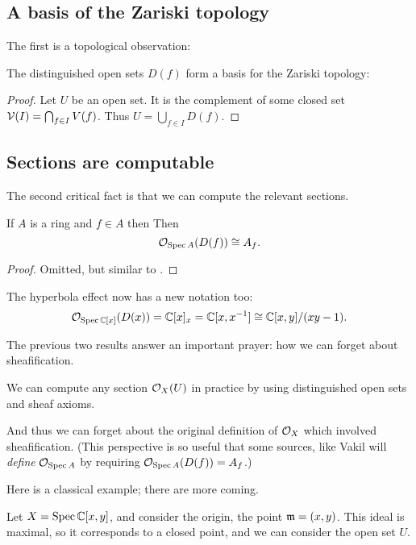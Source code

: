 \subsection{A basis of the Zariski topology}
The first is a topological observation:
\begin{theorem}
	The distinguished open sets $D(f)$
	form a basis for the Zariski topology:
\end{theorem}
\begin{proof}
	Let $U$ be an open set.
	It is the complement of some closed set
	$\mathcal V(I) = \bigcap_{f \in I} V(f)$.
	Thus $U = \bigcup_{f \in I} D(f)$.
\end{proof}

\subsection{Sections are computable}
The second critical fact is that we can compute the relevant sections.
\begin{theorem}
	If $A$ is a ring and $f \in A$ then
	Then \[ \mathcal O_{\operatorname{Spec} A}(D(f)) \cong A_f. \]
\end{theorem}
\begin{proof}
	Omitted, but similar to
	.
\end{proof}

\begin{example}
	The hyperbola effect now has a new notation too:
	\[ \mathcal O_{\operatorname{Spec} \mathbb C[x]} (D(x))
		= \mathbb C[x]_{x} = \mathbb C[x, x^{-1}]
		\cong \mathbb C[x,y] / (xy-1). \]
\end{example}

The previous two results answer an important prayer:
how we can forget about sheafification.
\begin{moral}
	We can compute any section $\mathcal O_X(U)$ in practice
	by using distinguished open sets and sheaf axioms.
\end{moral}
And thus we can forget about the original definition of $\mathcal O_X$
which involved sheafification.
(This perspective is so useful that some sources,
like Vakil \cite[\S4.1]{ref:vakil}
will \emph{define} $\mathcal O_{\operatorname{Spec} A}$
by requiring $\mathcal O_{\operatorname{Spec} A}(D(f)) = A_f$.)

Here is a classical example; there are more coming.
\begin{example}
	Let $X = \operatorname{Spec} \mathbb C[x,y]$,
	and consider the origin, the point $\mathfrak m = (x,y)$.
	This ideal is maximal, so it corresponds to a closed point,
	and we can consider the open set $U$.
\end{example}

